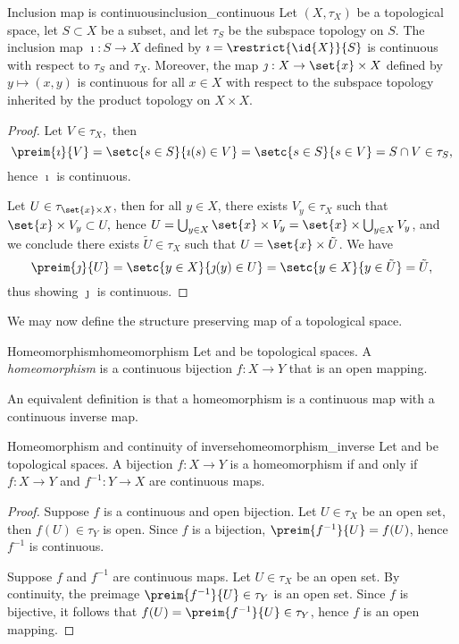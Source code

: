\begin{proposition}{Inclusion map is continuous}{inclusion_continuous}
    Let \((X, \tau_X)\) be a topological space, let \(S \subset X\) be a subset, and let \(\tau_S\) be the subspace topology on \(S\). The inclusion map \(\imath : S \to X\) defined by \(\imath = \restrict{\id{X}}{S}\) is continuous with respect to \(\tau_S\) and \(\tau_X\). Moreover, the map \(\jmath : X \to \set{x} \times X\) defined by \(y \mapsto (x,y)\) is continuous for all \(x \in X\) with respect to the subspace topology inherited by the product topology on \(X \times X\).
\end{proposition}
\begin{proof}
    Let \(V \in \tau_X,\) then
    \begin{equation*}
        \preim{\imath}{V} = \setc{s \in S}{\imath(s) \in V} = \setc{s \in S}{s \in V} = S \cap V \in \tau_S,
    \end{equation*}
    hence \(\imath\) is continuous.

    Let \(U \in \tau_{\set{x} \times X}\), then for all \(y \in X\), there exists \(V_y \in \tau_X\) such that \(\set{x} \times V_y \subset U,\) hence \(U = \bigcup_{y \in X} \set{x} \times V_y = \set{x} \times \bigcup_{y \in X} V_y\), and we conclude there exists \(\tilde{U} \in \tau_X\) such that \(U = \set{x} \times \tilde{U}\). We have
    \begin{equation*}
        \preim{\jmath}{U} = \setc{y \in X}{\jmath(y) \in U} = \setc{y \in X}{y \in \tilde{U}} = \tilde{U},
    \end{equation*}
    thus showing \(\jmath\) is continuous.
\end{proof}

We may now define the structure preserving map of a topological space.
\begin{definition}{Homeomorphism}{homeomorphism}
    Let  and  be topological spaces. A \emph{homeomorphism} is a continuous bijection \(f : X \to Y\) that is an open mapping.
\end{definition}

An equivalent definition is that a homeomorphism is a continuous map with a continuous inverse map.
\begin{theorem}{Homeomorphism and continuity of inverse}{homeomorphism_inverse}
    Let  and  be topological spaces. A bijection \(f : X \to Y\) is a homeomorphism if and only if \(f : X \to Y\) and \(f^{-1} : Y \to X\) are continuous maps.
\end{theorem}
\begin{proof}
    Suppose \(f\) is a continuous and open bijection. Let \(U \in \tau_X\) be an open set, then \(f(U) \in \tau_Y\) is open. Since \(f\) is a bijection, \(\preim{f^{-1}}{U} = f(U)\), hence \(f^{-1}\) is continuous.

    Suppose \(f\) and \(f^{-1}\) are continuous maps. Let \(U \in \tau_X\) be an open set. By continuity, the preimage \(\preim{f^{-1}}{U} \in \tau_Y\) is an open set. Since \(f\) is bijective, it follows that \(f(U) = \preim{f^{-1}}{U} \in \tau_Y\), hence \(f\) is an open mapping.
\end{proof}

